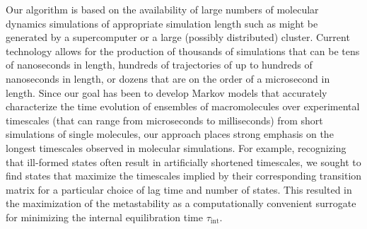 Our algorithm is based on the availability of large numbers of molecular dynamics simulations of appropriate simulation length such as might be generated by a supercomputer or a large (possibly distributed) cluster.  
Current technology allows for the production of thousands of simulations that can be tens of nanoseconds in length, hundreds of trajectories of up to hundreds of nanoseconds in length, or dozens that are on the order of a microsecond in length.
Since our goal has been to develop Markov models that accurately characterize the time evolution of ensembles of macromolecules over experimental timescales (that can range from microseconds to milliseconds) from short simulations of single molecules, our approach places strong emphasis on the longest timescales observed in molecular simulations.
For example, recognizing that ill-formed states often result in artificially shortened timescales, we sought to find states that maximize the timescales implied by their corresponding transition matrix for a particular choice of lag time and number of states.  
This resulted in the maximization of the metastability as a computationally convenient surrogate for minimizing the internal equilibration time $\tau_{\mathrm{int}}$.


